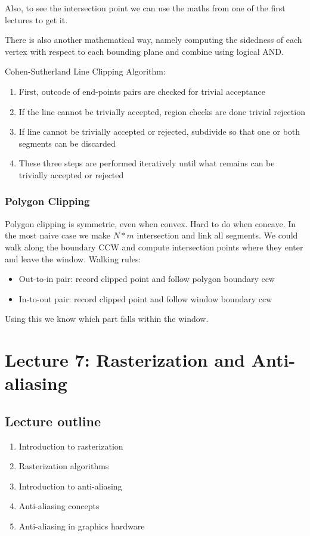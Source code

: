 \documentclass[11pt]{article}
\begin{document}
Also, to see the intersection point we can use the maths from one of the first lectures to get it.

There is also another mathematical way, namely computing the sidedness of each vertex with respect to each bounding plane and combine using logical AND. 

Cohen-Sutherland Line Clipping Algorithm:
\begin{enumerate}
    \item First, outcode of end-points pairs are checked for trivial acceptance
    \item If the line cannot be trivially accepted, region checks are done trivial rejection
    \item If line cannot be trivially accepted or rejected, subdivide so that one or both segments can be discarded
    \item These three steps are performed iteratively until what remains can be trivially accepted or rejected
\end{enumerate}


\subsubsection*{Polygon Clipping}
Polygon clipping is symmetric, even when convex. Hard to do when concave. In the most naive case we make $N*m$ intersection and link all segments. We could walk along the boundary CCW and compute intersection points where they enter and leave the window.
\newline
Walking rules: 
\begin{itemize}
    \item Out-to-in pair: record clipped point and follow polygon boundary ccw
    \item In-to-out pair: record clipped point and follow window boundary ccw
\end{itemize}

Using this we know which part falls within the window.

\section{Lecture 7: Rasterization and Anti-aliasing}
\subsection*{Lecture outline}
\begin{enumerate}
    \item Introduction to rasterization
    \item Rasterization algorithms
    \item Introduction to anti-aliasing
    \item Anti-aliasing concepts
    \item Anti-aliasing in graphics hardware
\end{enumerate}
\end{document}
